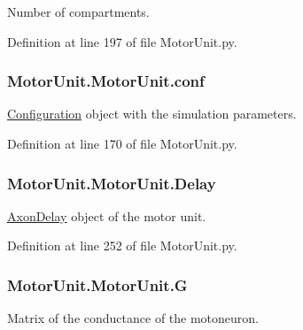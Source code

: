 Number of compartments. 



Definition at line 197 of file Motor\+Unit.\+py.

\subsubsection[{\texorpdfstring{conf}{conf}}]{\setlength{\rightskip}{0pt plus 5cm}Motor\+Unit.\+Motor\+Unit.\+conf}\hypertarget{class_motor_unit_1_1_motor_unit_a10539f5129881188923f3a3a164d2cba}{}\label{class_motor_unit_1_1_motor_unit_a10539f5129881188923f3a3a164d2cba}


\hyperlink{namespace_configuration}{Configuration} object with the simulation parameters. 



Definition at line 170 of file Motor\+Unit.\+py.

\subsubsection[{\texorpdfstring{Delay}{Delay}}]{\setlength{\rightskip}{0pt plus 5cm}Motor\+Unit.\+Motor\+Unit.\+Delay}\hypertarget{class_motor_unit_1_1_motor_unit_abe82ffa1e293d10225b67870a962eab8}{}\label{class_motor_unit_1_1_motor_unit_abe82ffa1e293d10225b67870a962eab8}


\hyperlink{namespace_axon_delay}{Axon\+Delay} object of the motor unit. 



Definition at line 252 of file Motor\+Unit.\+py.

\subsubsection[{\texorpdfstring{G}{G}}]{\setlength{\rightskip}{0pt plus 5cm}Motor\+Unit.\+Motor\+Unit.\+G}\hypertarget{class_motor_unit_1_1_motor_unit_a9b9f157ab92b47470ca7ec6bd3473dd3}{}\label{class_motor_unit_1_1_motor_unit_a9b9f157ab92b47470ca7ec6bd3473dd3}


Matrix of the conductance of the motoneuron. 

